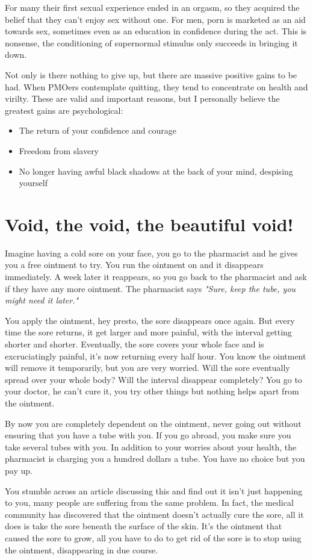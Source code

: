 \documentclass[easypeasy.tex]{subfiles}
\begin{document}
For many their first sexual experience ended in an orgasm, so they acquired the belief that they can't enjoy sex without one. For men, porn is marketed as an aid towards sex, sometimes even as an education in confidence during the act. This is nonsense, the conditioning of supernormal stimulus only succeeds in bringing it down.

Not only is there nothing to give up, but there are massive positive gains to be had. When PMOers contemplate quitting, they tend to concentrate on health and virilty. These are valid and important reasons, but I personally believe the greatest gains are psychological:
\begin{itemize}
  \item The return of your confidence and courage
  \item Freedom from slavery
  \item No longer having awful black shadows at the back of your mind, despising yourself
\end{itemize}
\section{Void, the void, the beautiful void!}
Imagine having a cold sore on your face, you go to the pharmacist and he gives you a free ointment to try. You run the ointment on and it disappears immediately. A week later it reappears, so you go back to the pharmacist and ask if they have any more ointment. The pharmacist says \textit{"Sure, keep the tube, you might need it later."}

You apply the ointment, hey presto, the sore disappears once again. But every time the sore returns, it get larger and more painful, with the interval getting shorter and shorter. Eventually, the sore covers your whole face and is excruciatingly painful, it's now returning every half hour. You know the ointment will remove it temporarily, but you are very worried. Will the sore eventually spread over your whole body? Will the interval disappear completely? You go to your doctor, he can't cure it, you try other things but nothing helps apart from the ointment.

By now you are completely dependent on the ointment, never going out without ensuring that you have a tube with you. If you go abroad, you make sure you take several tubes with you. In addition to your worries about your health, the pharmacist is charging you a hundred dollars a tube. You have no choice but you pay up.

You stumble across an article discussing this and find out it isn't just happening to you, many people are suffering from the same problem. In fact, the medical community has discovered that the ointment doesn't actually cure the sore, all it does is take the sore beneath the surface of the skin. It's the ointment that caused the sore to grow, all you have to do to get rid of the sore is to stop using the ointment, disappearing in due course.
\end{document}
